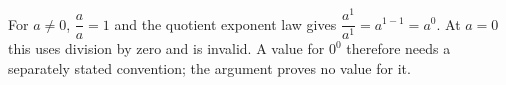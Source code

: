 For $a\ne0$, $\dfrac{a}{a}=1$ and the quotient exponent law gives $\dfrac{a^1}{a^1}=a^{1-1}=a^0$. At $a=0$ this uses division by zero and is invalid. A value for $0^0$ therefore needs a separately stated convention; the argument proves no value for it.
